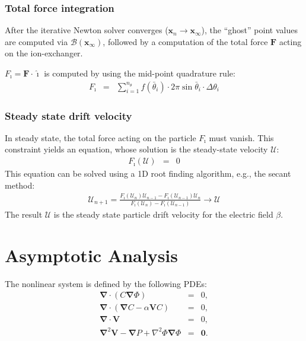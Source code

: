 \documentclass[final]{elsarticle}
\newcommand{\pars}[1]{\left(#1\right)}
\newcommand\Laplacian{\nabla^2}
\newcommand\bnabla{\boldsymbol{\nabla}}
\newcommand\bLaplacian{\boldsymbol{\nabla}^2}
\newcommand\bV{\boldsymbol{V}}
\newcommand\bF{\boldsymbol{F}}
\newcommand\bx{\boldsymbol{x}}
\newcommand\bzero{\boldsymbol{0}}
\newcommand\cB{\mathcal{B}}
\newcommand\cU{\mathscr{U}}
\newcommand\ui{\boldsymbol{\hat{\imath}}}
\begin{document}
\subsubsection{Total force integration}
After the iterative Newton solver converges ($\bx_n \rightarrow \bx_\infty$), 
the ``ghost'' point values are computed via $\cB(\bx_\infty)$,
followed by a computation of the total force $\bF$ acting on the ion-exchanger.

$F_\imath = \bF \cdot \ui$ is computed by using the mid-point quadrature rule:
\begin{eqnarray*}
F_\imath &=& \sum_{i=1}^{n_\theta} f(\bar\theta_i) \cdot 
              2 \pi \sin\bar\theta_i \cdot \Delta\theta_i
\end{eqnarray*}

\subsubsection{Steady state drift velocity}
In steady state, the total force acting on the particle $F_\imath$ must vanish.
This constraint yields an equation, whose solution is the steady-state velocity $\cU$:
\begin{eqnarray*}
F_\imath(\cU) &=& 0
\end{eqnarray*}
This equation can be solved using a 1D root finding algorithm, e.g., the secant method:
\begin{eqnarray*}
\cU_{n+1} = \frac{F_\imath(\cU_{n})\cU_{n-1} - F_\imath(\cU_{n-1})\cU_{n}}
{F_\imath(\cU_{n}) - F_\imath(\cU_{n-1})} \rightarrow \cU
\end{eqnarray*}
The result $\cU$ is the 
steady state particle drift velocity for the electric field $\beta$.

\section{Asymptotic Analysis} \label{sec:asymp}
The nonlinear system is defined by the following PDEs:
\label{PDEs}
\begin{eqnarray*}
\bnabla \cdot \pars{C \bnabla \varPhi} &=& 0, \\
\bnabla \cdot \pars{\bnabla C - \alpha \bV C} &=& 0, \\
\bnabla \cdot \bV &=& 0, \\
\bLaplacian \bV - \bnabla P + \Laplacian \varPhi \bnabla \varPhi &=& \bzero.
\end{eqnarray*}
\end{document}

